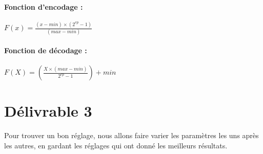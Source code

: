 \documentclass[12pt]{article}
\begin{document}
\paragraph{Fonction d'encodage :}
$F(x) = \frac{(x - min)\times(2^{ep}-1)}{(max - min)}$
\paragraph{Fonction de décodage :}
$F(X) = (\frac{X\times(max - min)}{2^{ep}-1})+min$

\section{Délivrable 3}
Pour trouver un bon réglage, nous allons faire varier les paramètres les uns après les autres, en gardant les réglages qui ont donné les meilleurs résultats.
\end{document}
